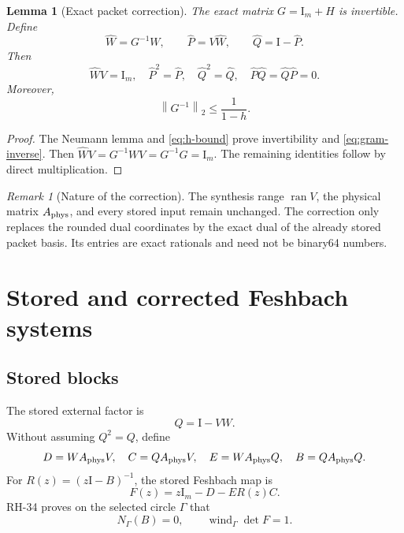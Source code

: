 \documentclass[11pt]{article}
\newtheorem{lemma}[theorem]{Lemma}
\theoremstyle{definition}
\theoremstyle{remark}
\newtheorem{remark}[theorem]{Remark}
\newcommand{\Id}{\mathrm I}
\newcommand{\norm}[1]{\left\lVert#1\right\rVert}
\newcommand{\wind}{\operatorname{wind}}
\newcommand{\Aphys}{A_{\rm phys}}
\begin{document}
\begin{lemma}[Exact packet correction]
\label{lem:packet-correction}
The exact matrix \(G=\Id_m+H\) is invertible.  Define
\begin{equation}
 \widehat W=G^{-1}W,\qquad
 \widehat P=V\widehat W,\qquad
 \widehat Q=\Id-\widehat P.
 \label{eq:corrected-pair}
\end{equation}
Then
\begin{equation}
 \widehat WV=\Id_m,\quad
 \widehat P^2=\widehat P,\quad
 \widehat Q^2=\widehat Q,\quad
 \widehat P\widehat Q=\widehat Q\widehat P=0.
 \label{eq:corrected-identities}
\end{equation}
Moreover,
\begin{equation}
 \norm{G^{-1}}_2\leq\frac{1}{1-h}.
 \label{eq:gram-inverse}
\end{equation}
\end{lemma}

\begin{proof}
The Neumann lemma and \cref{eq:h-bound} prove invertibility and
\cref{eq:gram-inverse}.  Then
\(\widehat WV=G^{-1}WV=G^{-1}G=\Id_m\).  The remaining identities follow
by direct multiplication.
\end{proof}

\begin{remark}[Nature of the correction]
\label{rem:not-refit}
The synthesis range \(\operatorname{ran}V\), the physical matrix
\(\Aphys\), and every stored input remain unchanged.  The correction only
replaces the rounded dual coordinates by the exact dual of the already
stored packet basis.  Its entries are exact rationals and need not be
binary64 numbers.
\end{remark}

\section{Stored and corrected Feshbach systems}
\label{sec:feshbach-systems}

\subsection{Stored blocks}

The stored external factor is
\begin{equation}
 Q=\Id-VW.
 \label{eq:stored-q}
\end{equation}
Without assuming \(Q^2=Q\), define
\begin{equation}
 D=W\Aphys V,\quad
 C=Q\Aphys V,\quad
 E=W\Aphys Q,\quad
 B=Q\Aphys Q.
 \label{eq:stored-blocks}
\end{equation}
For \(R(z)=(z\Id-B)^{-1}\), the stored Feshbach map is
\begin{equation}
 F(z)=z\Id_m-D-E R(z)C.
 \label{eq:stored-f}
\end{equation}
RH-34 proves on the selected circle \(\Gamma\) that
\begin{equation}
 N_\Gamma(B)=0,\qquad
 \wind_\Gamma\det F=1.
 \label{eq:rh34-input}
\end{equation}
\end{document}
